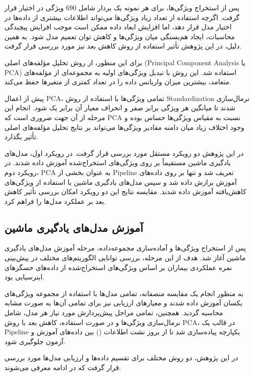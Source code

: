 پس از استخراج ویژگی‌ها، برای هر نمونه یک بردار شامل 690 ویژگی در اختیار قرار گرفت. اگرچه استفاده از تعداد زیاد ویژگی‌ها می‌تواند اطلاعات بیشتری از داده‌ها در اختیار مدل قرار دهد، اما افزایش ابعاد داده ممکن است موجب افزایش پیچیدگی محاسبات، ایجاد هم‌بستگی میان ویژگی‌ها و کاهش توان تعمیم مدل شود. به همین دلیل، در این پژوهش تأثیر استفاده از روش کاهش بعد نیز مورد بررسی قرار گرفت.

برای این منظور، از روش تحلیل مؤلفه‌های اصلی (Principal Component Analysis یا PCA) استفاده شد. این روش با تبدیل ویژگی‌های اولیه به مجموعه‌ای از مؤلفه‌های متعامد، بیشترین میزان واریانس داده را در تعداد کمتری از متغیرها حفظ می‌کند.

پیش از اعمال PCA، تمامی ویژگی‌ها با استفاده از روش Standardization نرمال‌سازی شدند تا میانگین هر ویژگی برابر صفر و انحراف معیار آن برابر یک شود. انجام این مرحله از آن جهت ضروری است که PCA نسبت به مقیاس ویژگی‌ها حساس بوده و وجود اختلاف زیاد میان دامنه مقادیر ویژگی‌ها می‌تواند بر نتایج تحلیل مؤلفه‌های اصلی تأثیر بگذارد.

در این پژوهش دو رویکرد مستقل مورد بررسی قرار گرفت. در رویکرد اول، مدل‌های یادگیری ماشین مستقیماً بر روی ویژگی‌های استخراج‌شده آموزش داده شدند. در رویکرد دوم، PCA به عنوان بخشی از Pipeline تعریف شد و تنها بر روی داده‌های آموزش برازش داده شد و سپس مدل‌های یادگیری ماشین با استفاده از ویژگی‌های کاهش‌یافته آموزش داده شدند. مقایسه نتایج این دو رویکرد امکان بررسی تأثیر کاهش بعد بر عملکرد مدل‌ها را فراهم کرد.


\subsection{آموزش مدل‌های یادگیری ماشین}

پس از استخراج ویژگی‌ها و آماده‌سازی مجموعه‌داده، مرحله آموزش مدل‌های یادگیری ماشین آغاز شد. هدف از این مرحله، بررسی توانایی الگوریتم‌های مختلف در پیش‌بینی نمره عملکردی بیماران بر اساس ویژگی‌های استخراج‌شده از داده‌های حسگرهای اینرسیایی بود.

به منظور انجام یک مقایسه منصفانه، تمامی مدل‌ها با استفاده از مجموعه ویژگی‌های یکسان آموزش داده شدند و معیارهای ارزیابی نیز برای تمامی آن‌ها به صورت مشابه محاسبه گردید. همچنین، تمامی مراحل پیش‌پردازش مورد نیاز هر مدل، شامل نرمال‌سازی ویژگی‌ها و در صورت استفاده، کاهش بعد با روش PCA، در قالب یک Pipeline یکپارچه پیاده‌سازی شد تا از بروز نشت اطلاعات () بین داده‌های آموزش و آزمون جلوگیری شود.

در این پژوهش، دو روش مختلف برای تقسیم داده‌ها و ارزیابی مدل‌ها مورد بررسی قرار گرفت که در ادامه معرفی می‌شوند.


